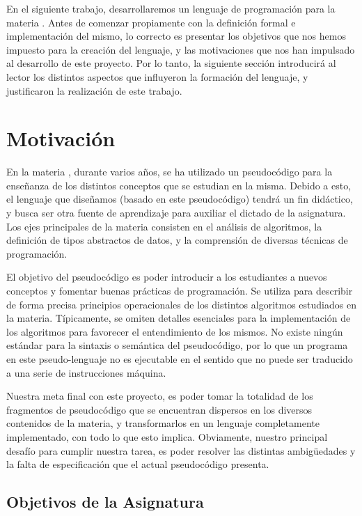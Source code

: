 En el siguiente trabajo, desarrollaremos un lenguaje de programación para la materia \Materia{}.
Antes de comenzar propiamente con la definición formal e implementación del mismo, lo correcto es presentar los objetivos que nos hemos impuesto para la creación del lenguaje, y las motivaciones que nos han impulsado al desarrollo de este proyecto.
Por lo tanto, la siguiente sección introducirá al lector los distintos aspectos que influyeron la formación del lenguaje, y justificaron la realización de este trabajo.

\section{Motivación}

En la materia \Materia{}, durante varios años, se ha utilizado un pseudocódigo para la enseñanza de los distintos conceptos que se estudian en la misma.
Debido a esto, el lenguaje que diseñamos (basado en este pseudocódigo) tendrá un fin didáctico, y busca ser otra fuente de aprendizaje para auxiliar el dictado de la asignatura.
Los ejes principales de la materia consisten en el análisis de algoritmos, la definición de tipos abstractos de datos, y la comprensión de diversas técnicas de programación.

El objetivo del pseudocódigo es poder introducir a los estudiantes a nuevos conceptos y fomentar buenas prácticas de programación.
Se utiliza para describir de forma precisa principios operacionales de los distintos algoritmos estudiados en la materia.
Típicamente, se omiten detalles esenciales para la implementación de los algoritmos para favorecer el entendimiento de los mismos.
No existe ningún estándar para la sintaxis o semántica del pseudocódigo, por lo que un programa en este pseudo-lenguaje  no es ejecutable en el sentido que no puede ser traducido a una serie de instrucciones máquina.

Nuestra meta final con este proyecto, es poder tomar la totalidad de los fragmentos de pseudocódigo que se encuentran dispersos en los diversos contenidos de la materia, y transformarlos en un lenguaje completamente implementado, con todo lo que esto implica.
Obviamente, nuestro principal desafío para cumplir nuestra tarea, es poder resolver las distintas ambigüedades y la falta de especificación que el actual pseudocódigo presenta.

\subsection{Objetivos de la Asignatura}

